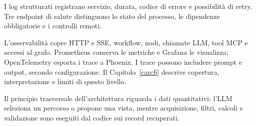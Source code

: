 I log strutturati registrano servizio, durata, codice di errore e possibilità
di retry. Tre endpoint di salute distinguono lo stato del processo, le
dipendenze obbligatorie e i controlli remoti.

L'osservabilità copre HTTP e SSE, workflow, nodi, chiamate LLM, tool MCP e
accessi al grafo. Prometheus conserva le metriche e Grafana le visualizza;
OpenTelemetry esporta i trace a Phoenix. I trace possono includere prompt e
output, secondo configurazione. Il Capitolo~\ref{cap:6} descrive copertura,
interpretazione e limiti di questo livello.

Il principio trasversale dell'architettura riguarda i dati quantitativi: l'LLM
seleziona un percorso o propone una vista, mentre acquisizione, filtri, calcoli
e validazione sono eseguiti dal codice sui record recuperati.
